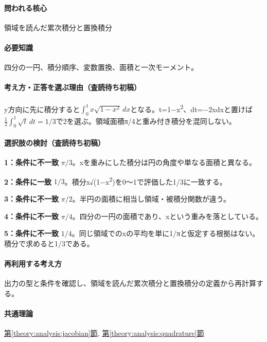 \paragraph{問われる核心} 領域を読んだ累次積分と置換積分

\paragraph{必要知識} 四分の一円、積分順序、変数置換、面積と一次モーメント。

\paragraph{考え方・正答を選ぶ理由（査読待ち初稿）} y方向に先に積分すると\(\int_0^1x\sqrt{1-x^2}\,dx\)となる。t=\allowbreak{}1−x\textsuperscript{2}、dt=−2xdxと置けば\(\frac12\int_0^1\sqrt t\,dt=1/3\)で2を選ぶ。領域面積π/4と重み付き積分を混同しない。

\paragraph{選択肢の検討（査読待ち初稿）}\mbox{}\par

\noindent\textbf{1：条件に不一致} \(\pi/3\)。xを重みにした積分は円の角度や単なる面積と異なる。\par

\noindent\textbf{2：条件に一致} \(1/3\)。積分x√(1−x\textsuperscript{2})を0〜1で評価した1/3に一致する。\par

\noindent\textbf{3：条件に不一致} \(\pi/2\)。半円の面積に相当し領域・被積分関数が違う。\par

\noindent\textbf{4：条件に不一致} \(\pi/4\)。四分の一円の面積であり、xという重みを落としている。\par

\noindent\textbf{5：条件に不一致} \(1/4\)。同じ領域でのxの平均を単に1/πと仮定する根拠はない。積分で求めると1/3である。\par

\paragraph{再利用する考え方} 出力の型と条件を確認し、領域を読んだ累次積分と置換積分の定義から再計算する。

\paragraph{共通理論} \hyperref[theory:analysis:jacobian]{第\ref*{theory:analysis:jacobian}節}, \hyperref[theory:analysis:quadrature]{第\ref*{theory:analysis:quadrature}節}

